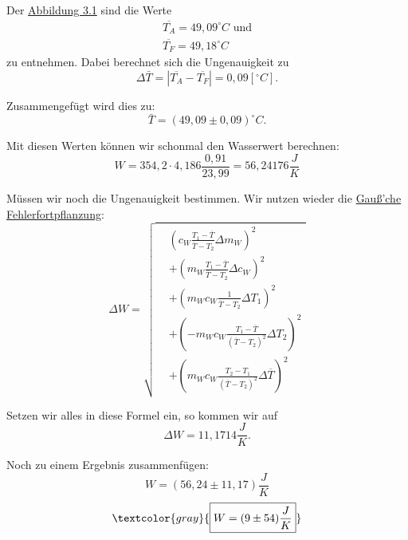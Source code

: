 Der \hyperref[fig:temp_against_time]{Abbildung 3.1} sind die Werte
\begin{align}
    \overline{T_A} = 49,09^\circ C  \text{ und}\\
    \overline{T_F} = 49,18^\circ C
\end{align}
zu entnehmen. Dabei berechnet sich die Ungenauigkeit zu
\begin{equation}
    \Delta \bar{T} = \left| \overline{T_A} - \overline{T_F} \right| = 0,09 [^\circ C].
\end{equation}

Zusammengefügt wird dies zu:
\begin{equation}
    \bar{T} = (49,09 \pm 0,09) ^\circ C.
\end{equation}

Mit diesen Werten können wir schonmal den Wasserwert berechnen:
\begin{equation}
    W = 354,2 \cdot 4,186 \frac{0,91}{23,99} = 56,24176 \frac{J}{K}
\end{equation}

Müssen wir noch die Ungenauigkeit bestimmen. Wir nutzen wieder die \hyperref[eq:gauss_fehlfortpflanzung]{Gauß'che Fehlerfortpflanzung}:
\begin{equation}
    \Delta W = 
    \sqrt{
    \begin{aligned}
    &\left( c_W \frac{T_1 - \overline{T}}{\overline{T} - T_2} \Delta m_W \right)^2 \\
    &+ \left( m_W \frac{T_1 - \overline{T}}{\overline{T} - T_2} \Delta c_W \right)^2 \\
    &+ \left( m_W c_W \frac{1}{\overline{T} - T_2} \Delta T_1 \right)^2 \\
    &+ \left( - m_W c_W \frac{T_1 - \overline{T}}{(\overline{T} - T_2)^2} \Delta T_2 \right)^2 \\
    &+ \left( m_W c_W \frac{T_2 - T_1}{(\overline{T} - T_2)^2} \Delta \overline{T} \right)^2
    \end{aligned}
    }
    \label{eq:deltaW}
\end{equation}

Setzen wir alles in diese Formel ein, so kommen wir auf
\begin{equation}
    \Delta W = 11,1714 \frac{J}{K}.
\end{equation}

Noch zu einem Ergebnis zusammenfügen:
\begin{equation}
    \boxed{W = (56,24 \pm 11,17) \frac{J}{K}}
\end{equation}
\begin{equation*}
    \textcolor{gray}{
        \boxed{W = (9 \pm 54) \frac{J}{K}}
    }
\end{equation*}

